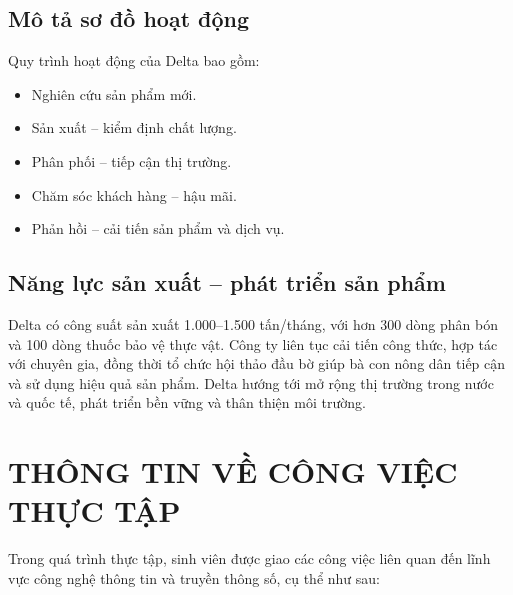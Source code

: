 \subsection{ Mô tả sơ đồ hoạt động}
Quy trình hoạt động của Delta bao gồm:
\begin{itemize}
    \item Nghiên cứu sản phẩm mới.
    \item Sản xuất – kiểm định chất lượng.
    \item Phân phối – tiếp cận thị trường.
    \item Chăm sóc khách hàng – hậu mãi.
    \item Phản hồi – cải tiến sản phẩm và dịch vụ.
\end{itemize}

\subsection{ Năng lực sản xuất – phát triển sản phẩm}
Delta có công suất sản xuất 1.000–1.500 tấn/tháng, với hơn 300 dòng phân bón và 100 dòng thuốc bảo vệ thực vật. Công ty liên tục cải tiến công thức, hợp tác với chuyên gia, đồng thời tổ chức hội thảo đầu bờ giúp bà con nông dân tiếp cận và sử dụng hiệu quả sản phẩm. Delta hướng tới mở rộng thị trường trong nước và quốc tế, phát triển bền vững và thân thiện môi trường.
\section{THÔNG TIN VỀ CÔNG VIỆC THỰC TẬP}
Trong quá trình thực tập, sinh viên được giao các công việc liên quan đến lĩnh vực công nghệ thông tin và truyền thông số, cụ thể như sau:

